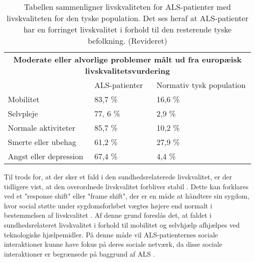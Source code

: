 \begin{table}[H]
\centering
\begin{tabular}{l| l| l}
\multicolumn{3}{c}{\textbf{Moderate eller alvorlige problemer målt ud fra europæisk livskvalitetsvurdering}}
   \\
                                                                         & ALS-patienter                                    & Normativ tysk population                                   \\
                                                                         \hline
                                                                  
Mobilitet                                                                & 83,7 \%                                          & 16,6 \%                                                    \\
Selvpleje                                                                & 77, 6 \%                                         & 2,9 \%                                                     \\
Normale aktiviteter                                                      & 85,7 \%                                          & 10,2 \%                                                    \\
Smerte eller ubehag                                                      & 61,2 \%                                          & 27,9 \%                                                    \\
Angst eller depression                                                   & 67,4 \%                                          & 4,4 \%                                                    \\
\end{tabular}
\caption{Tabellen sammenligner livskvaliteten for ALS-patienter med livskvaliteten for den tyske population. Det ses heraf at ALS-patienter har en forringet livskvalitet i forhold til den resterende tyske befolkning.\citep{ilse2015} (Revideret)}
\label{tab:livskvalitet}
\end{table}

\noindent
Til trods for, at der sker et fald i den sundhedsrelaterede livskvalitet, er der tidligere vist, at den overordnede livskvalitet forbliver stabil \citep{ilse2015, nuebert2004}. Dette kan forklares ved et "response shift" eller "frame shift", der er en måde at håndtere sin sygdom, hvor social støtte under sygdomsforløbet vægtes højere end normalt i bestemmelsen af livskvalitet \citep{ilse2015}. Af denne grund foreslås det, at faldet i sundhedsrelateret livskvalitet i forhold til mobilitet og selvhjælp afhjælpes ved teknologiske hjælpemidler. På denne måde vil ALS-patienternes sociale interaktioner kunne have fokus på deres sociale netværk, da disse sociale interaktioner er begrænsede på baggrund af ALS \citep{ilse2015,tramonti2012}.







